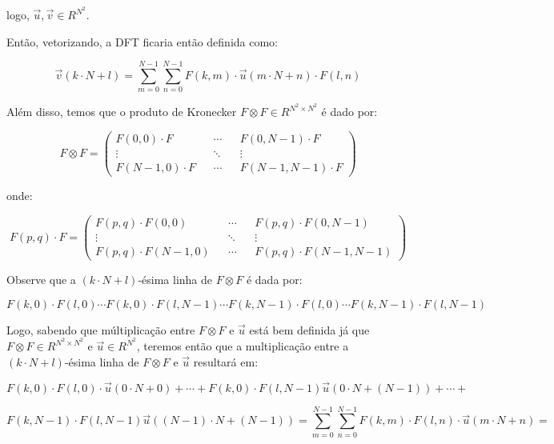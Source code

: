 \documentclass[]{abntex2}
\begin{document}
logo, $\vec{u}, \vec{v} \in R^{N^2}$.

Então, vetorizando, a DFT ficaria então definida como:

\begin{equation*}
	\vec{v}(k\cdot N + l) = \sum_{m=0}^{N-1} \sum_{n=0}^{N-1} F(k,m) \cdot \vec{u}(m\cdot N + n) \cdot F(l,n)
\end{equation*}

Além disso, temos que o produto de Kronecker $F \otimes F \in R^{N^2 \times N^2}$ é dado por:

\begin{equation*}
	F \otimes F = \begin{pmatrix}
		F(0,0)\cdot F && \cdots && F(0,N-1)\cdot F \\
		\vdots && \ddots && \vdots  \\
		F(N-1,0)\cdot F && \cdots && F(N-1,N-1)\cdot F
		\end{pmatrix}
\end{equation*}

onde:

\begin{equation*}
	F(p,q) \cdot F = \begin{pmatrix}
		F(p,q)\cdot F(0, 0) && \cdots && F(p,q)\cdot F(0, N-1) \\
		\vdots && \ddots && \vdots  \\
		F(p,q)\cdot F(N-1,0) && \cdots && F(p,q)\cdot F(N-1,N-1)
		\end{pmatrix}
\end{equation*}

Observe que a $(k\cdot N+l)$-ésima linha de $F \otimes F$ é dada por:

\begin{equation*}
		F(k,0)\cdot F(l,0) \cdots F(k,0)\cdot F(l,N-1) \cdots F(k,N-1)\cdot F(l,0) \cdots F(k,N-1)\cdot F(l,N-1)
\end{equation*}

Logo, sabendo que múltiplicação entre $F \otimes F$ e $\vec{u}$ está bem definida já que $F \otimes F\in R^{N^2\times N^2}$ e $\vec{u}\in R^{N^2}$, teremos então que a multiplicação entre a $(k\cdot N+l)$-ésima linha de $F \otimes F$ e $\vec{u}$ resultará em:

\begin{equation*}
	F(k,0)\cdot F(l,0) \cdot \vec{u}(0\cdot N + 0) + \cdots +  F(k,0)\cdot F(l,N-1) \vec{u}(0\cdot N + (N-1)) + \cdots + 
\end{equation*}

\begin{equation*}
	F(k,N-1)\cdot F(l,N-1)\vec{u}((N-1)\cdot N + (N-1)) = \sum_{m=0}^{N-1} \sum_{n=0}^{N-1} F(k,m) \cdot F(l,n) \cdot \vec{u}(m\cdot N+n) = 
\end{equation*}
\end{document}
